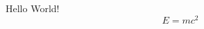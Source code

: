 \documentclass{article}
\begin{document}
    Hello World!
    \[
        E = mc^2
    \]
\end{document}
